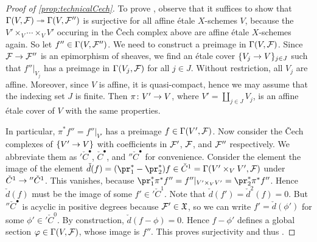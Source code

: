 \begin{proof}[Proof of \cref{prop:technicalCech}]
	To prove \itememph{*}, observe that it suffices to show that $\Global(V,\Ff)\epimorphism \Global(V,\Ff'')$ is surjective for all affine étale $X$-schemes $V$, because the $V'\times_V\dotsb\times_VV'$ occuring in the \v Cech complex above are affine étale $X$-schemes again. So let $f''\in \operatorname{\Gamma}(V,\mathcal{F}'')$. We need to construct a preimage in $\operatorname{\Gamma}(V,\mathcal{F})$. Since $\Ff\morphism\Ff''$ is an epimorphism of sheaves, we find an étale cover $\{V_j\morphism V\}_{j\in J}$ such that $f''|_{V_j}$ has a preimage in $\operatorname{\Gamma}(V_j,\mathcal{F})$ for all $j\in J$. Without restriction, all $V_j$ are affine. Moreover, since $V$ is affine, it is quasi-compact, hence we may assume that the indexing set $J$ is finite. Then $\pi\colon V'\morphism V$, where $V'=\coprod_{j\in J}V_j$, is an affine étale cover of $V$ with the same properties.
	
	In particular, $\pi^*f''=f''|_{V'}$ has a preimage $f\in \operatorname{\Gamma}(V',\mathcal{F})$. Now consider the \v Cech complexes of $\{V'\morphism V\}$ with coefficients in $\mathcal{F}'$, $\mathcal{F}$, and $\mathcal{F}''$ respectively. We abbreviate them as $'\check{C}^\bullet$, $\check{C}^\bullet$, and $''\check{C}^\bullet$ for convenience. Consider the element the image of the element $\check{d}(f)=(\pr_1^*-\pr_2^*)f\in \check{C}^1=\Global(V'\times_VV',\Ff)$ under $\check{C}^1\morphism {''\check{C}^1}$. This vanishes, because $\pr_1^*\pi^*f''=f''|_{V'\times_VV'}=\pr_2^*\pi^*f''$. Hence $\check{d}(f)$ must be the image of some $f'\in {'\check{C}^1}$. Note that $\check{d}(f')=\check{d}^2(f)=0$. But $''\check{C}^\bullet$ is acyclic in positive degrees because $\mathcal{F}'\in \mathfrak{X}$, so we can write $f'=\check{d}(\phi')$ for some $\phi'\in {'\check{C}^0}$. By construction, $\check{d}(f-\phi)=0$. Hence $f-\phi'$ defines a global section $\varphi\in \operatorname{\Gamma}(V,\mathcal{F})$, whose image is $f''$. This proves surjectivity and thus \itememph{*}.
	

\end{proof}
